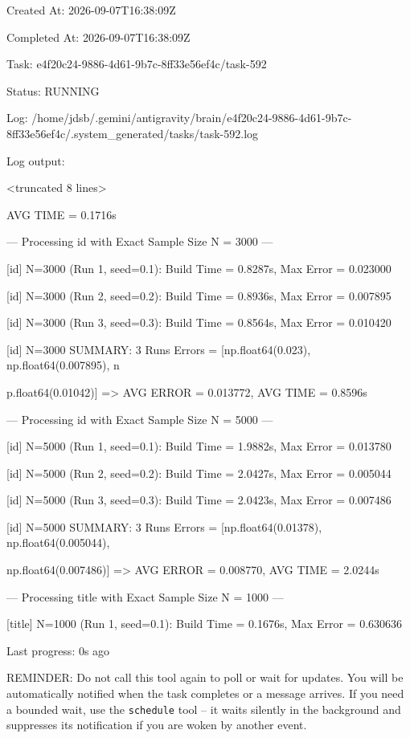 \documentclass[11pt,a4paper]{article}
\begin{document}
Created At: 2026-09-07T16:38:09Z

Completed At: 2026-09-07T16:38:09Z

Task: e4f20c24-9886-4d61-9b7c-8ff33e56ef4c/task-592

Status: RUNNING

Log: /home/jdsb/.gemini/antigravity/brain/e4f20c24-9886-4d61-9b7c-8ff33e56ef4c/.system\_generated/tasks/task-592.log

Log output:

<truncated 8 lines>

AVG TIME = 0.1716s

--- Processing id with Exact Sample Size N = 3000 ---

[id] N=3000 (Run 1, seed=0.1): Build Time = 0.8287s, Max Error = 0.023000

[id] N=3000 (Run 2, seed=0.2): Build Time = 0.8936s, Max Error = 0.007895

[id] N=3000 (Run 3, seed=0.3): Build Time = 0.8564s, Max Error = 0.010420

[id] N=3000 SUMMARY: 3 Runs Errors = [np.float64(0.023), np.float64(0.007895), n

p.float64(0.01042)] => AVG ERROR = 0.013772, AVG TIME = 0.8596s

--- Processing id with Exact Sample Size N = 5000 ---

[id] N=5000 (Run 1, seed=0.1): Build Time = 1.9882s, Max Error = 0.013780

[id] N=5000 (Run 2, seed=0.2): Build Time = 2.0427s, Max Error = 0.005044

[id] N=5000 (Run 3, seed=0.3): Build Time = 2.0423s, Max Error = 0.007486

[id] N=5000 SUMMARY: 3 Runs Errors = [np.float64(0.01378), np.float64(0.005044),

np.float64(0.007486)] => AVG ERROR = 0.008770, AVG TIME = 2.0244s


--- Processing title with Exact Sample Size N = 1000 ---

[title] N=1000 (Run 1, seed=0.1): Build Time = 0.1676s, Max Error = 0.630636


Last progress: 0s ago



REMINDER: Do not call this tool again to poll or wait for updates. You will be automatically notified when the task completes or a message arrives. If you need a bounded wait, use the \texttt{schedule} tool -- it waits silently in the background and suppresses its notification if you are woken by another event.
\end{document}
